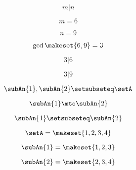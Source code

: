 {\begin{forslides}
    \begin{equation}
        \label{eq:feedback-017}
        m | n
    \end{equation}

    \begin{equation}
        \label{eq:feedback-018}
        m = 6
    \end{equation}

    \begin{equation}
        \label{eq:feedback-019}
        n = 9
    \end{equation}

    \begin{equation}
        \label{eq:feedback-020}
        \gcd \makeset{6, 9 } = 3
    \end{equation}

    \begin{equation}
        \label{eq:feedback-021}
        3 | 6
    \end{equation}

    \begin{equation}
        \label{eq:feedback-022}
        3 | 9
    \end{equation}

    \begin{equation}
        \label{eq:feedback-023}
        \subAn{1}, \subAn{2} \setsubseteq \setA
    \end{equation}

    \begin{equation}
        \label{eq:feedback-024}
        \subAn{1} \mto \subAn{2}
    \end{equation}

    \begin{equation}
        \label{eq:feedback-025}
        \subAn{1} \setsubseteq \subAn{2}
    \end{equation}

    \begin{equation}
        \label{eq:feedback-026}
        \setA = \makeset{ 1, 2, 3, 4 }
    \end{equation}

    \begin{equation}
        \label{eq:feedback-027}
        \subAn{1} = \makeset{ 1, 2, 3 }
    \end{equation}

    \begin{equation}
        \label{eq:feedback-028}
        \subAn{2} = \makeset{2, 3, 4 }
    \end{equation}


\end{forslides}}
